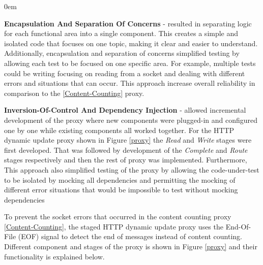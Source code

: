 \documentclass[a4paper,11pt,twoside]{report}
\begin{document}
\begin{list}{-}{}
  \itemsep0em
  \item\textbf{Encapsulation And Separation Of Concerns} - resulted in separating logic for each functional area into a single component. This creates a simple and isolated code that focuses on one topic, making it clear and easier to understand. Additionally, encapsulation and separation of concerns simplified testing by allowing each test to be focused on one specific area. For example, multiple tests could be writing focusing on reading from a socket and dealing with different errors and situations that can occur.  This approach increase overall reliability in comparison to the \ref{Content-Counting} proxy. 

  \item\textbf{Inversion-Of-Control And Dependency Injection} - allowed incremental development of the proxy where new components were plugged-in and configured one by one while existing components all worked together. For the HTTP dynamic update proxy shown in Figure \ref{proxy} the \textit{Read} and \textit{Write} stages were first developed. That was followed by development of the  \textit{Complete} and \textit{Route} stages respectively and then the rest of proxy was implemented. Furthermore, This approach also simplified testing of the proxy by allowing the code-under-test to be isolated by mocking all dependencies and permitting the mocking of different error situations that would be impossible to test without mocking dependencies  
\end{list}

\noindent
To prevent the socket errors that occurred in the content counting proxy \ref{Content-Counting}, the staged HTTP dynamic update proxy uses the End-Of-File (EOF) signal to detect the end of messages instead of content counting. Different component and stages of the proxy is shown in Figure \ref{proxy} and their functionality is explained below.\bigskip
\end{document}
